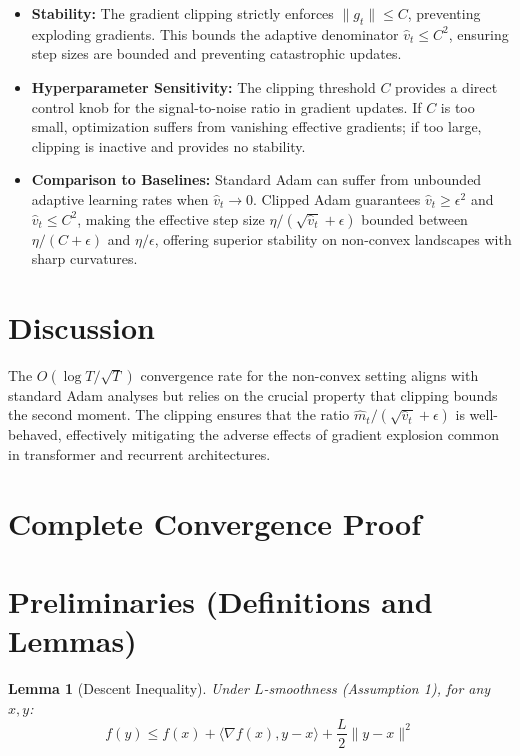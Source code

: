 \documentclass{article}
\newtheorem{lemma}[theorem]{Lemma}
\begin{document}
\begin{itemize}
    \item \textbf{Stability:} The gradient clipping strictly enforces $\|g_t\| \leq C$, preventing exploding gradients. This bounds the adaptive denominator $\hat{v}_t \leq C^2$, ensuring step sizes are bounded and preventing catastrophic updates.
    \item \textbf{Hyperparameter Sensitivity:} The clipping threshold $C$ provides a direct control knob for the signal-to-noise ratio in gradient updates. If $C$ is too small, optimization suffers from vanishing effective gradients; if too large, clipping is inactive and provides no stability.
    \item \textbf{Comparison to Baselines:} Standard Adam can suffer from unbounded adaptive learning rates when $\hat{v}_t \to 0$. Clipped Adam guarantees $\hat{v}_t \geq \epsilon^2$ and $\hat{v}_t \leq C^2$, making the effective step size $\eta / (\sqrt{\hat{v}_t} + \epsilon)$ bounded between $\eta / (C + \epsilon)$ and $\eta / \epsilon$, offering superior stability on non-convex landscapes with sharp curvatures.
\end{itemize}

\section*{Discussion}

The $O(\log T / \sqrt{T})$ convergence rate for the non-convex setting aligns with standard Adam analyses but relies on the crucial property that clipping bounds the second moment. The clipping ensures that the ratio $\hat{m}_t / (\sqrt{\hat{v}_t} + \epsilon)$ is well-behaved, effectively mitigating the adverse effects of gradient explosion common in transformer and recurrent architectures.

\section*{Complete Convergence Proof}

\section*{Preliminaries (Definitions and Lemmas)}

\begin{lemma}[Descent Inequality]
Under $L$-smoothness (Assumption 1), for any $x, y$:
$$ f(y) \leq f(x) + \langle \nabla f(x), y - x \rangle + \frac{L}{2} \|y - x\|^2 $$
\end{lemma}
\end{document}
